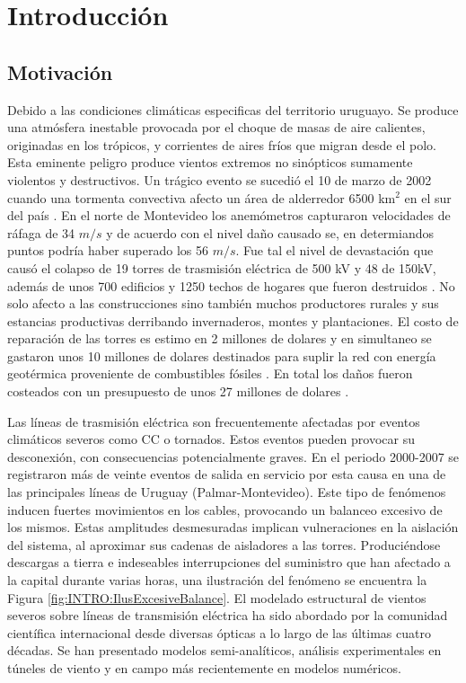 \chapter{Introducción}\label{Cap:Introduccion}
 
\section{Motivación}
\linenumbers

Debido a las condiciones climáticas especificas del territorio uruguayo. Se produce una atmósfera inestable provocada por el choque de masas de aire calientes, originadas en los trópicos, y corrientes de aires fríos que migran desde el polo. Esta eminente peligro produce vientos extremos no sinópticos sumamente violentos y destructivos. Un trágico evento se sucedió el 10 de marzo de 2002 cuando una tormenta convectiva afecto un área de alderredor 6500 km$^2$ en el sur del país \cite{tormenta2002}. En el norte de Montevideo los anemómetros capturaron velocidades de ráfaga de 34 $m/s$ y de acuerdo con el nivel daño causado se, en determiandos puntos podría haber superado los 56 $m/s$. Fue tal el nivel de devastación que causó el colapso de 19 torres de trasmisión eléctrica de 500 kV y 48 de 150kV, además de unos 700 edificios y 1250 techos de hogares que fueron destruidos \citep{duranona2015significance}. No solo afecto a las construcciones sino también muchos productores rurales y sus estancias productivas derribando invernaderos, montes y plantaciones. El costo de reparación de las torres es estimo en 2 millones de dolares y en simultaneo se gastaron unos 10 millones de dolares destinados para suplir la red con energía geotérmica proveniente de combustibles fósiles . En total los daños fueron costeados con un presupuesto de unos 27 millones de dolares \cite{duranona2019first}.

Las líneas de trasmisión eléctrica son frecuentemente afectadas por eventos climáticos severos como \gls{CC} o tornados. Estos eventos pueden provocar su desconexión, con consecuencias potencialmente graves. En el periodo 2000-2007 se registraron más de veinte eventos de salida en servicio por esta causa en una de las principales líneas de Uruguay (Palmar-Montevideo). Este tipo de fenómenos inducen fuertes movimientos en los cables, provocando un balanceo excesivo de los mismos. Estas amplitudes desmesuradas implican vulneraciones en la aislación del sistema, al aproximar sus cadenas de aisladores a las torres. Produciéndose descargas a tierra e indeseables interrupciones del suministro que han afectado a la capital durante varias horas, una ilustración del fenómeno se encuentra la Figura \ref{fig:INTRO:IlusExcesiveBalance}. El modelado estructural de vientos severos sobre líneas de transmisión eléctrica ha sido abordado por la comunidad científica internacional desde diversas ópticas a lo largo de las últimas cuatro décadas. Se han presentado modelos semi-analíticos, análisis experimentales en túneles de viento y en campo más recientemente en modelos numéricos.
 

